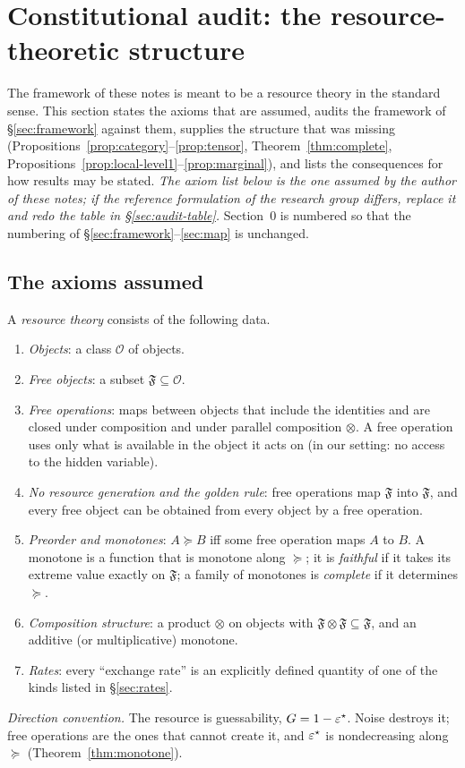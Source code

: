 \setcounter{section}{-1}
\section{Constitutional audit: the resource-theoretic structure}\label{sec:constitution}

The framework of these notes is meant to be a resource theory in the standard sense. This section states the axioms that are assumed, audits the framework of \S\ref{sec:framework}
against them, supplies the structure that was missing (Propositions~\ref{prop:category}--\ref{prop:tensor}, Theorem~\ref{thm:complete}, Propositions~\ref{prop:local-level1}--\ref{prop:marginal}), and
lists the consequences for how results may be stated. \emph{The axiom list below is the one assumed by the author of these notes; if the reference formulation of the research group differs, replace it and redo the table in \S\ref{sec:audit-table}.}
Section~0 is numbered so that the numbering of \S\ref{sec:framework}--\ref{sec:map} is unchanged.

\subsection{The axioms assumed}\label{sec:axioms}

A \emph{resource theory} consists of the following data.
\begin{enumerate}[(RT1)]
\item \emph{Objects}: a class $\mathcal O$ of objects.
\item \emph{Free objects}: a subset $\mathfrak F\subseteq\mathcal O$.
\item \emph{Free operations}: maps between objects that include the identities and are closed under composition and under parallel composition $\otimes$. A free operation uses only what is available in the object it acts on
(in our setting: no access to the hidden variable).
\item \emph{No resource generation and the golden rule}: free operations map $\mathfrak F$ into $\mathfrak F$, and every free object can be obtained from every object by a free operation.
\item \emph{Preorder and monotones}: $A\succeq B$ iff some free operation maps $A$ to $B$. A monotone is a function that is monotone along $\succeq$; it is \emph{faithful} if it takes its extreme value exactly on $\mathfrak F$;
a family of monotones is \emph{complete} if it determines $\succeq$.
\item \emph{Composition structure}: a product $\otimes$ on objects with $\mathfrak F\otimes\mathfrak F\subseteq\mathfrak F$, and an additive (or multiplicative) monotone.
\item \emph{Rates}: every ``exchange rate'' is an explicitly defined quantity of one of the kinds listed in \S\ref{sec:rates}.
\end{enumerate}
\emph{Direction convention.} The resource is guessability, $G=1-\varepsilon^{\star}$. Noise destroys it; free operations are the ones that cannot create it, and $\varepsilon^{\star}$ is nondecreasing along $\succeq$ (Theorem~\ref{thm:monotone}).

